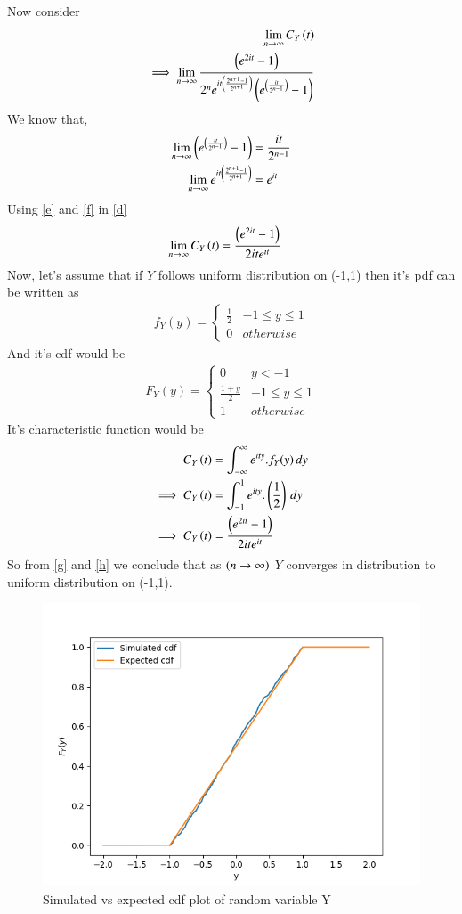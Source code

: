 \documentclass[journal,12pt,twocolumn]{IEEEtran}
\begin{document}
Now consider
\begin{align}
     \lim_{n\to\infty} C_{Y}\left(t\right)\\
    \implies \lim_{n\to\infty}\frac{\left(e^{2it}-1\right)}{2^ne^{it\left(\frac{2^{n+1}-1}{2^{n+1}}\right)}\left(e^{\left(\frac{it}{2^{n-1}}\right)}-1\right)}
    \label{d}
\end{align}
We know that,
\begin{align}
    \lim_{n\to\infty}\left(e^{\left(\frac{it}{2^{n-1}}\right)}-1\right) &= \frac{it}{2^{n-1}}
    \label{e}\\
    \lim_{n\to\infty}e^{it\left(\frac{2^{n+1}-1}{2^{n+1}}\right)}&=e^{it}
    \label{f}
\end{align}
Using \eqref{e} and \eqref{f} in \eqref{d}
\begin{align}
    \lim_{n\to\infty} C_{Y}\left(t\right)&=\frac{\left(e^{2it}-1\right)}{2ite^{it}}
    \label{g}
\end{align}
Now, let's assume that if $Y$ follows uniform distribution on (-1,1) then it's pdf can be written as
\begin{align}
    f_{Y}(y)=\begin{cases} 
            \frac{1}{2}  &  -1\le y\le 1\\
            0 &  otherwise
            \end{cases}
\end{align}
And it's cdf would be
\begin{align}
    F_{Y}(y)=\begin{cases} 
            0 & y<-1\\
            \frac{1+y}{2}  &  -1\le y\le 1\\
            1 &  otherwise
            \end{cases}
\end{align}
It's characteristic function would be 
\begin{align}
   C_{Y}\left(t\right)&= \int_{-\infty}^{\infty} e^{ity}.f_{Y}(y) \,dy\\
    \implies C_{Y}\left(t\right)&=\int_{-1}^{1} e^{ity}.\left(\frac{1}{2}\right) \,dy\\
    \implies C_{Y}\left(t\right)&=\frac{\left(e^{2it}-1\right)}{2ite^{it}}
    \label{h}
\end{align}
So from \eqref{g} and \eqref{h} we conclude that as $\left(n\rightarrow\infty\right)$ $Y$ converges in distribution to uniform distribution on (-1,1).
\begin{figure}[h]
    \centering
    \includegraphics[width=\linewidth]{simulated_cdf.png}
    \caption{Simulated vs expected cdf plot of random variable Y}
    \label{cdf_plot}
\end{figure}
\end{document}
